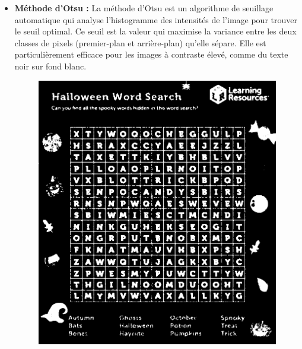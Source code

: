 \documentclass{article}
\begin{document}
  \begin{itemize}
    \item \textbf{Méthode d'Otsu :} La méthode d'Otsu est un algorithme de seuillage automatique qui analyse l'histogramme des intensités de l'image pour trouver le seuil optimal. Ce seuil est la valeur qui maximise la variance entre les deux classes de pixels (premier-plan et arrière-plan) qu'elle sépare. Elle est particulièrement efficace pour les images à contraste élevé, comme du texte noir sur fond blanc.
    \begin{figure}[H]
      \centering
          \includegraphics[width=\linewidth]{ressources/image_2_word_detection_03_otsu_threshold.png}
          \caption{}
        \endminipage\quad\quad\quad\quad

\end{figure}
\end{itemize}
\end{document}
